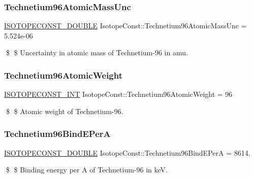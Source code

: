 \subsubsection{\texorpdfstring{Technetium96\+Atomic\+Mass\+Unc}{Technetium96AtomicMassUnc}}
{\footnotesize\ttfamily \mbox{\hyperlink{group___isotope_const-_macros_ga8f45a7272ce02c0b4c65c44636ed719a}{I\+S\+O\+T\+O\+P\+E\+C\+O\+N\+S\+T\+\_\+\+D\+O\+U\+B\+LE}} Isotope\+Const\+::\+Technetium96\+Atomic\+Mass\+Unc = 5.\+524e-\/06}

\$ \$ Uncertainty in atomic mass of Technetium-\/96 in amu. \mbox{\label{group___isotope_const-_technetium-_tc96_gaefa9008619b858346514797ad242887a}} 
\subsubsection{\texorpdfstring{Technetium96\+Atomic\+Weight}{Technetium96AtomicWeight}}
{\footnotesize\ttfamily \mbox{\hyperlink{group___isotope_const-_macros_ga5f18360b3e99483a35c32d789e62621c}{I\+S\+O\+T\+O\+P\+E\+C\+O\+N\+S\+T\+\_\+\+I\+NT}} Isotope\+Const\+::\+Technetium96\+Atomic\+Weight = 96}

\$ \$ Atomic weight of Technetium-\/96. \mbox{\label{group___isotope_const-_technetium-_tc96_gaf12f2d68f3409809c84a26f053f31cf2}} 
\subsubsection{\texorpdfstring{Technetium96\+Bind\+E\+PerA}{Technetium96BindEPerA}}
{\footnotesize\ttfamily \mbox{\hyperlink{group___isotope_const-_macros_ga8f45a7272ce02c0b4c65c44636ed719a}{I\+S\+O\+T\+O\+P\+E\+C\+O\+N\+S\+T\+\_\+\+D\+O\+U\+B\+LE}} Isotope\+Const\+::\+Technetium96\+Bind\+E\+PerA = 8614.}

\$ \$ Binding energy per A of Technetium-\/96 in keV. \mbox{\label{group___isotope_const-_technetium-_tc96_gad678401ecba7becec3f5a7a6829f0a74}} 
